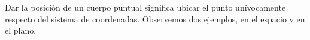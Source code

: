 











% 




Dar la posición de un cuerpo puntual significa ubicar el punto unívocamente respecto del sistema de coordenadas. Observemos dos ejemplos, en el espacio y en el plano.


